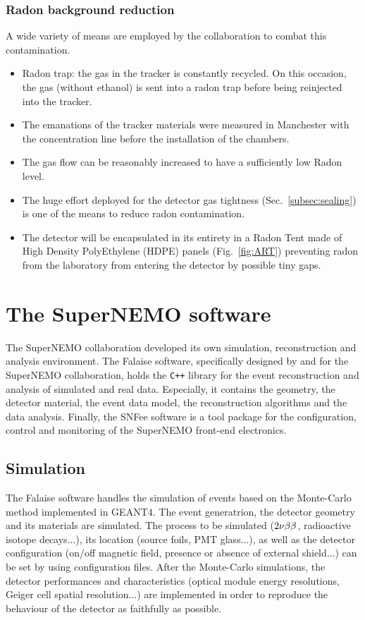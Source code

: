 \subsubsection*{Radon background reduction}

A wide variety of means are employed by the collaboration to combat this contamination.
\begin{itemize}
\item Radon trap: the gas in the tracker is constantly recycled.
  On this occasion, the gas (without ethanol) is sent into a radon trap before being reinjected into the tracker.
\item The emanations of the tracker materials were measured in Manchester with the concentration line before the installation of the chambers.
\item The gas flow can be reasonably increased to have a sufficiently low Radon level.
\item The huge effort deployed for the detector gas tightness (Sec.~\ref{subsec:sealing}) is one of the means to reduce radon contamination.
\item The detector will be encapsulated in its entirety in a Radon Tent made of High Density PolyEthylene (HDPE) panels (Fig.~\ref{fig:ART}) preventing radon from the laboratory from entering the detector by possible tiny gaps.
\end{itemize}


\section{The SuperNEMO software}
\label{sec:SNsoftware}

The SuperNEMO collaboration developed its own simulation, reconstruction and analysis environment.
The Falaise software, specifically designed by and for the SuperNEMO collaboration, holds the \verb!C++! library for the event reconstruction and analysis of simulated and real data.
Especially, it contains the geometry, the detector material, the event data model, the reconstruction algorithms and the data analysis.
Finally, the SNFee software is a tool package for the configuration, control and monitoring of the SuperNEMO front-end electronics.


\subsection{Simulation}

The Falaise software handles the simulation of events based on the Monte-Carlo method implemented in GEANT$4$.
The event generatrion, the detector geometry and its materials are simulated.
The process to be simulated ($2\nu\beta\beta$, radioactive isotope decays...), its location (source foils, PMT glass...), as well as the detector configuration (on/off magnetic field, presence or absence of external shield...) can be set by using configuration files.
After the Monte-Carlo simulations, the detector performances and characteristics (optical module energy resolutions, Geiger cell spatial resolution...) are implemented in order to reproduce the behaviour of the detector as faithfully as possible.


